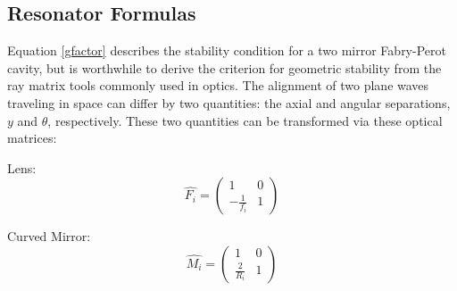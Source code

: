 \begin{appendices}

	\chapter{Resonator Formulas} \label{FPappendix}
	Equation \ref{gfactor} describes the stability condition for a two mirror Fabry-Perot cavity, but is worthwhile to derive the criterion for geometric stability from the ray matrix tools commonly used in optics. The alignment of two plane waves traveling in space can differ by two quantities: the axial and angular separations,  $y$ and $\theta$, respectively.  These two quantities can be transformed via these optical matrices:
	
	Lens:
	\begin{equation} \label{lens}
	\hat{F_i} = 
	\begin{pmatrix}
		1				&0			
	\\ 	-\frac{1}{f_i}	&1
	\end{pmatrix}
	\end{equation}
	
	Curved Mirror:
	\begin{equation} \label{mirror}
	\hat{M_i} = 
	\begin{pmatrix}
		1				&0			
	\\ 	\frac{2}{R_i}	&1
	\end{pmatrix}
	\end{equation}
	

\end{appendices}
